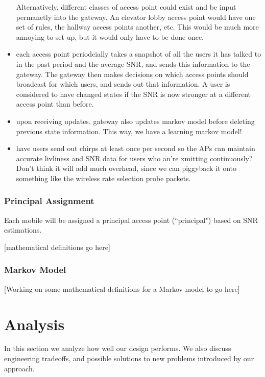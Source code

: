 \documentclass[letterpaper,12pt]{article}
\begin{document}
\begin{itemize}
Alternatively, different classes of access point could exist and be input
permanetly into the gateway. An elevator lobby access point would have one
set of rules, the hallway access points another, etc. This would be 
much more annoying to set up, but it would only have to be done once.

\item each access point periodcially takes a snapshot of all the users it has
talked to in the past period and the average SNR, and sends this information
to the gateway. The gateway then makes decisions on which access points
should broadcast for which users, and sends out that information.
A user is considered to  have changed states if the SNR is now stronger at a 
different access point than before. 

\item upon receiving updates, gateway also updates markov model before deleting
previous state information. This way, we have a learning markov model!

\item have users send out chirps at least once per second so the APs can 
maintain accurate livliness and SNR data for users who an're xmitting 
continuously? Don't think it will add much overhead, since we can piggyback 
it onto something like the wireless rate selection probe packets.

\end{itemize}

\subsubsection{Principal Assignment}
Each mobile will be assigned a principal access point (``principal") based on SNR estimations.

[mathematical definitions go here]

\subsubsection{Markov Model}
[Working on some mathematical definitions for a Markov model to go here]

\section{Analysis}

In this section we analyze how well our design performs. We also discuss 
engineering tradeoffs, and possible solutions to new problems introduced by 
our approach.
\end{document}
